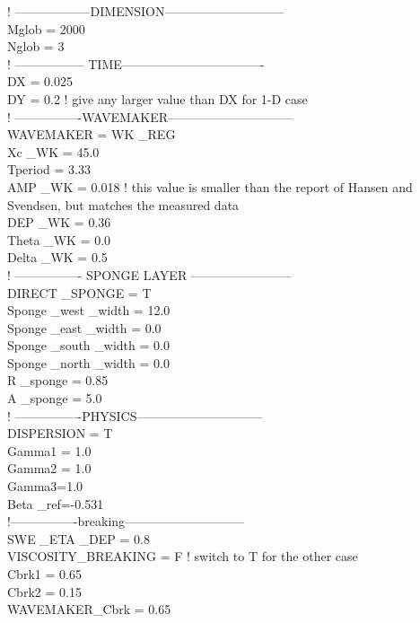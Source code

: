 \documentclass[11pt]{article}
\begin{document}
  ! ------------------DIMENSION-----------------------------\\
Mglob = 2000\\
Nglob = 3\\
  ! ----------------- TIME----------------------------------\\
DX = 0.025\\
DY = 0.2   ! give any larger value than DX for 1-D case \\
  ! ----------------WAVEMAKER------------------------------\\
 WAVEMAKER = WK \_REG\\
  Xc \_WK = 45.0\\
Tperiod = 3.33\\
AMP \_WK = 0.018   ! this value is smaller than the report of Hansen and Svendsen, but matches the measured data \\  
DEP \_WK = 0.36\\
Theta \_WK = 0.0\\
Delta \_WK = 0.5 \\
  ! ---------------- SPONGE LAYER ------------------------\\
 DIRECT \_SPONGE = T\\
Sponge \_west \_width = 12.0\\
Sponge \_east \_width =  0.0\\
Sponge \_south \_width = 0.0\\
Sponge \_north \_width = 0.0\\
R \_sponge = 0.85\\
A \_sponge = 5.0 \\
  ! ----------------PHYSICS------------------------------\\
 DISPERSION = T\\
Gamma1 = 1.0\\
Gamma2 = 1.0\\
Gamma3=1.0\\
Beta \_ref=-0.531\\
  !----------------breaking----------------------------- \\
SWE \_ETA \_DEP = 0.8\\
VISCOSITY\_BREAKING = F  !  switch to T for the other case \\
Cbrk1 = 0.65 \\
Cbrk2 = 0.15 \\
WAVEMAKER\_Cbrk = 0.65 \\
\end{document}
